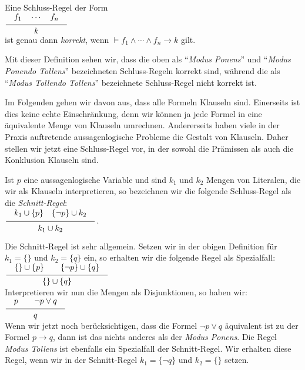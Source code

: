 \begin{Definition}
  Eine Schluss-Regel der Form \\[0.2cm]
  \hspace*{1.3cm} $\schluss{f_1 \quad \cdots \quad f_n}{k}$ \\[0.2cm]
  ist genau dann \emph{korrekt}, wenn 
  $\models f_1 \wedge \cdots \wedge f_n \rightarrow k$ gilt. \eox
\end{Definition}
Mit dieser Definition sehen wir, dass 
die oben als ``\emph{Modus Ponens}'' und ``\emph{Modus Ponendo Tollens}'' bezeichneten
Schluss-Regeln korrekt sind, w\"{a}hrend die als  ``\emph{Modus Tollendo Tollens}'' bezeichnete
Schluss-Regel nicht korrekt ist.

Im Folgenden gehen wir davon aus, dass alle Formeln Klauseln sind.  Einerseits ist dies
keine echte Einschr\"{a}nkung, denn wir k\"{o}nnen ja jede Formel in eine \"{a}quivalente Menge von
Klauseln umrechnen.  Andererseits haben viele in der Praxis auftretende aussagenlogische
Probleme die Gestalt von Klauseln.  Daher stellen wir jetzt eine Schluss-Regel vor, in der
sowohl die Pr\"{a}missen als auch die Konklusion Klauseln sind.
     
\begin{Definition}
    Ist $p$ eine aussagenlogische Variable und sind $k_1$ und $k_2$ Mengen von Literalen,
    die wir als Klauseln interpretieren, so bezeichnen wir die folgende Schluss-Regel
    als die \emph{Schnitt-Regel}: 
    \\[0.2cm]
    \hspace*{1.3cm}
    $\displaystyle \schluss{ k_1 \cup \{p\} \quad \{\neg p\} \cup k_2 }{k_1 \cup k_2}$. 
    \eox
\end{Definition}

\noindent
Die Schnitt-Regel ist sehr allgemein.  Setzen wir in der obigen Definition f\"{u}r $k_1 =
\{\}$ und  $k_2 = \{q\}$ 
ein, so erhalten wir die folgende Regel als Spezialfall: \\[0.2cm]
\hspace*{1.3cm} $\schluss{\{\} \cup \{p\} \quad\quad \{\neg p\} \cup \{ q \} }{ \{\} \cup \{q\} }$ \\[0.2cm]
Interpretieren wir nun die Mengen als Disjunktionen, so haben wir: \\[0.2cm]
\hspace*{1.3cm}  $\schluss{p \quad\quad \neg p \vee q }{ q }$ \\[0.2cm]
Wenn wir jetzt noch ber\"{u}cksichtigen, dass die Formel $\neg p \vee q$ \"{a}quivalent ist zu der
Formel $p \rightarrow q$, dann ist das nichts anderes als der \emph{Modus Ponens}.  
Die Regel \emph{Modus Tollens} ist ebenfalls ein Spezialfall der Schnitt-Regel.  Wir
erhalten diese Regel, wenn wir in der Schnitt-Regel $k_1 = \{ \neg q \}$ und $k_2 = \{\}$ setzen.

